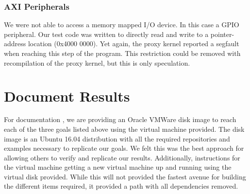 \documentclass[journal]{IEEEtran}
\begin{document}
\subsubsection{AXI Peripherals}
We were not able to access a memory mapped I/O device. In this case a GPIO peripheral. Our test code was written to directly read and write to a pointer-address location (0x4000 0000). Yet again, the proxy kernel reported a segfault when reaching this step of the program. This restriction could be removed with recompilation of the proxy kernel, but this is only speculation.

\section{Document Results}
For documentation , we are providing an Oracle VMWare disk image to reach each of the three goals listed above using the virtual machine provided. The disk image is an Ubuntu 16.04 distribution with all the required repositories and examples necessary to replicate our goals. We felt this was the best approach for allowing others to verify and replicate our results. Additionally, instructions for the virtual machine getting a new virtual machine up and running using the virtual disk provided. While this will not provided the fastest avenue for building the different items required, it provided a path with all dependencies removed. 


%
%

\end{document}
